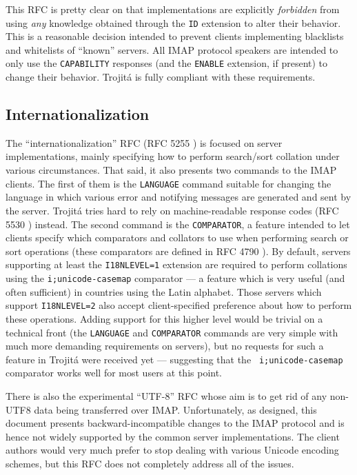 \documentclass[trojita]{subfiles}
\begin{document}
This RFC is pretty clear on that implementations are explicitly {\em forbidden} from using {\em any} knowledge obtained
through the {\tt ID} extension to alter their behavior.  This is a reasonable decision intended to prevent clients
implementing blacklists and whitelists of ``known'' servers.  All IMAP protocol speakers are intended to only use the
{\tt CAPABILITY} responses (and the {\tt ENABLE} extension, if present) to change their behavior.  Trojitá is fully
compliant with these requirements.

\subsection{Internationalization}

The ``internationalization'' RFC (RFC 5255 \cite{rfc5255}) is focused on server implementations, mainly specifying how
to perform search/sort collation under various circumstances.  That said, it also presents two commands to the IMAP
clients.  The first of them is the {\tt LANGUAGE} command suitable for changing the language in which various error and
notifying messages are generated and sent by the server.  Trojitá tries hard to rely on machine-readable response codes
(RFC 5530 \cite{rfc5530}) instead.  The second command is the {\tt COMPARATOR}, a feature intended to let clients
specify which comparators and collators to use when performing search or sort operations (these comparators are defined
in RFC 4790 \cite{rfc4790}).  By default, servers supporting at least the {\tt I18NLEVEL=1} extension are required to
perform collations using the {\tt i;unicode-casemap} comparator \cite{rfc5051} --- a feature which is very useful (and
often sufficient) in countries using the Latin alphabet.  Those servers which support {\tt I18NLEVEL=2} also accept
client-specified preference about how to perform these operations.  Adding support for this higher level would be
trivial on a technical front (the {\tt LANGUAGE} and {\tt COMPARATOR} commands are very simple with much more demanding
requirements on servers), but no requests for such a feature in Trojitá were received yet --- suggesting that the {\tt
i;unicode-casemap} comparator works well for most users at this point.

There is also the experimental ``UTF-8'' RFC \cite{rfc5738} whose aim is to get rid of any non-UTF8 data being
transferred over IMAP.  Unfortunately, as designed, this document presents backward-incompatible changes to the IMAP
protocol and is hence not widely supported by the common server implementations.  The client authors would very much
prefer to stop dealing with various Unicode encoding schemes, but this RFC does not completely address all of the
issues.
\end{document}
